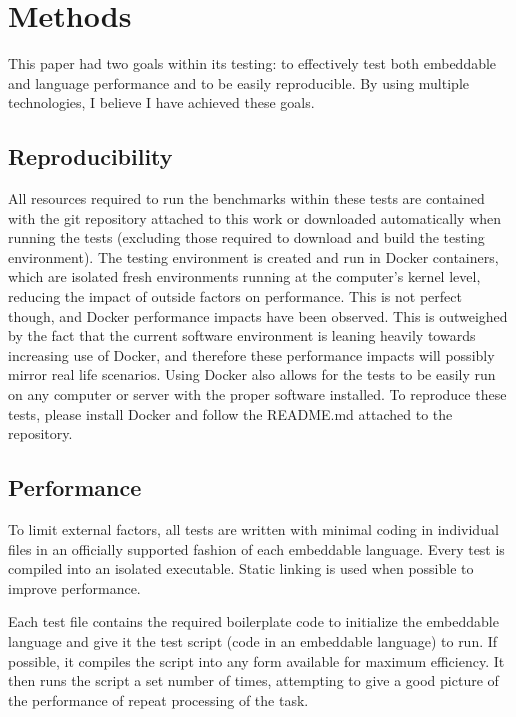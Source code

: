 \section{Methods} \label{sec:methods}
This paper had two goals within its testing: to effectively test both embeddable and language performance and to be easily reproducible. By using multiple technologies, I believe I have achieved these goals.

\subsection{Reproducibility}
All resources required to run the benchmarks within these tests are contained with the git repository attached to this work or downloaded automatically when running the tests (excluding those required to download and build the testing environment). The testing environment is created and run in Docker\cite{docker} containers, which are isolated fresh environments running at the computer's kernel level\cite{docker:container}, reducing the impact of outside factors on performance. This is not perfect though, and Docker performance impacts have been observed. This is outweighed by the fact that the current software environment is leaning heavily towards increasing use of Docker, and therefore these performance impacts will possibly mirror real life scenarios. Using Docker also allows for the tests to be easily run on any computer or server with the proper software installed.\cite{docker:container} To reproduce these tests, please install Docker and follow the README.md attached to the repository.

\subsection{Performance}
To limit external factors, all tests are written with minimal coding in individual files in an officially supported fashion of each embeddable language. Every test is compiled into an isolated executable. Static linking is used when possible to improve performance. 

Each test file contains the required boilerplate code to initialize the embeddable language and give it the test script (code in an embeddable language) to run. If possible, it compiles the script into any form available for maximum efficiency. It then runs the script a set number of times, attempting to give a good picture of the performance of repeat processing of the task.

